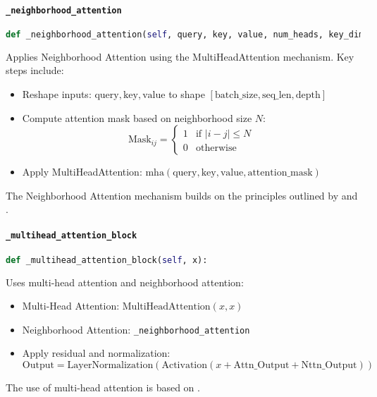 \documentclass{article}
\begin{document}
\paragraph{\texttt{\_neighborhood\_attention}}
\begin{lstlisting}[language=Python]
def _neighborhood_attention(self, query, key, value, num_heads, key_dim, neighborhood_size, dropout_rate=0.1):
\end{lstlisting}
Applies Neighborhood Attention using the MultiHeadAttention mechanism. Key steps include:
\begin{itemize}
    \item Reshape inputs: \(\text{query}, \text{key}, \text{value}\) to shape \([ \text{batch\_size}, \text{seq\_len}, \text{depth} ]\)
    \item Compute attention mask based on neighborhood size \(N\):
    \[
    \text{Mask}_{ij} = 
    \begin{cases} 
    1 & \text{if } |i - j| \leq N \\
    0 & \text{otherwise}
    \end{cases}
    \]
    \item Apply MultiHeadAttention: \(\text{mha}(\text{query}, \text{key}, \text{value}, \text{attention\_mask})\)
\end{itemize}
The Neighborhood Attention mechanism builds on the principles outlined by \cite{vaswani2017attention} and \cite{parmar2018image}.

\paragraph{\texttt{\_multihead\_attention\_block}}
\begin{lstlisting}[language=Python]
def _multihead_attention_block(self, x):
\end{lstlisting}
Uses multi-head attention and neighborhood attention:
\begin{itemize}
    \item Multi-Head Attention: \( \text{MultiHeadAttention}(x, x) \)
    \item Neighborhood Attention: \texttt{\_neighborhood\_attention}
    \item Apply residual and normalization:
    \[
    \text{Output} = \text{LayerNormalization}(\text{Activation}(x + \text{Attn\_Output} + \text{Nttn\_Output}))
    \]
\end{itemize}
The use of multi-head attention is based on \cite{vaswani2017attention}.
\end{document}
